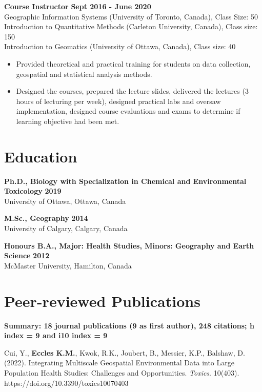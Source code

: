 \documentclass[margin,line]{res}
\begin{document}
\begin{resume}
{\bf Course Instructor} \hfill {\bf Sept 2016 - June 2020}\\
Geographic Information Systems (University of Toronto, Canada), Class Size: 50\\
Introduction to Quantitative Methods (Carleton University, Canada), Class size: 150\\
Introduction to Geomatics (University of Ottawa, Canada), Class size: 40\\
\begin{itemize}
\item Provided theoretical and practical training for students on data collection, geospatial and statistical analysis methods.
\item Designed the courses, prepared the lecture slides, delivered the lectures (3 hours of lecturing per week), designed practical labs and oversaw implementation, designed course evaluations and exams to determine if learning objective had been met.
\end{itemize}

\vspace*{.1in}
\section{\sc Education}

\textbf{Ph.D., Biology with Specialization in Chemical and Environmental Toxicology} \hfill {\bf 2019}\\
University of Ottawa, Ottawa, Canada

\textbf{M.Sc., Geography}  \hfill {\bf 2014}\\
University of Calgary, Calgary, Canada

\textbf{Honours B.A., Major: Health Studies, Minors: Geography and Earth Science }\hfill {\bf 2012}\\
McMaster University, Hamilton, Canada

\vspace*{.1in}

\section{\sc Peer-reviewed Publications}
\textbf{Summary: 18 journal publications (9 as first author), 248 citations; h index = 9 and i10 index = 9}

Cui, Y., \textbf{Eccles K.M.}, Kwok, R.K., Joubert, B., Messier, K.P., Balshaw, D. (2022). Integrating Multiscale Geospatial Environmental Data into Large Population Health Studies: Challenges and Opportunities. \textit{Toxics}. 10(403). https://doi.org/10.3390/toxics10070403


\end{resume}
\end{document}
